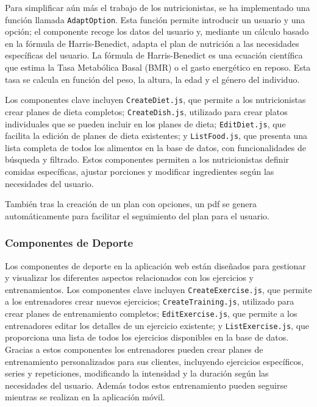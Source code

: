 Para simplificar aún más el trabajo de los nutricionistas, se ha implementado una función llamada \texttt{AdaptOption}. Esta función permite introducir un usuario y una opción; el componente recoge los datos del usuario y, mediante un cálculo basado en la fórmula de Harris-Benedict, adapta el plan de nutrición a las necesidades específicas del usuario. La fórmula de Harris-Benedict es una ecuación científica que estima la Tasa Metabólica Basal (BMR) o el gasto energético en reposo. Esta tasa se calcula en función del peso, la altura, la edad y el género del individuo.

Los componentes clave incluyen \texttt{CreateDiet.js}, que permite a los nutricionistas crear planes de dieta completos; \texttt{CreateDish.js}, utilizado para crear platos individuales que se pueden incluir en los planes de dieta; \texttt{EditDiet.js}, que facilita la edición de planes de dieta existentes; y \texttt{ListFood.js}, que presenta una lista completa de todos los alimentos en la base de datos, con funcionalidades de búsqueda y filtrado. Estos componentes permiten a los nutricionistas definir comidas específicas, ajustar porciones y modificar ingredientes según las necesidades del usuario.

También tras la creación de un plan con opciones, un pdf se genera automáticamente para facilitar el seguimiento del plan para el usuario.

\subsubsection{Componentes de Deporte}
Los componentes de deporte  en la aplicación web están diseñados para gestionar y visualizar los diferentes aspectos relacionados con los ejercicios y entrenamientos. Los componentes clave incluyen \texttt{CreateExercise.js}, que permite a los entrenadores crear nuevos ejercicios; \texttt{CreateTraining.js}, utilizado para crear planes de entrenamiento completos; \texttt{EditExercise.js}, que permite a los entrenadores editar los detalles de un ejercicio existente; y \texttt{ListExercise.js}, que proporciona una lista de todos los ejercicios disponibles en la base de datos. Gracias a estos componentes los entrenadores pueden crear planes de entrenamiento personalizados para sus clientes, incluyendo ejercicios específicos, series y repeticiones, modificando la intensidad y la duración según las necesidades del usuario. Además todos estos entrenamiento pueden seguirse mientras se realizan en la aplicación móvil.


